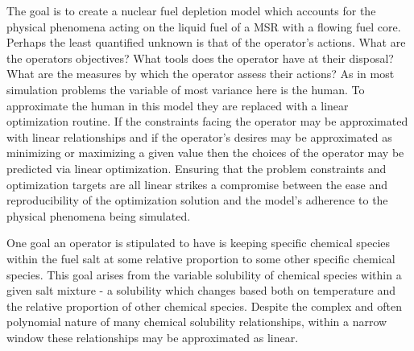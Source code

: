 The goal is to create a nuclear fuel depletion model which accounts for the
physical phenomena acting on the liquid fuel of a MSR with a flowing fuel core.
Perhaps the least quantified unknown is that of the operator's actions. What are
the operators objectives? What tools does the operator have at their disposal?
What are the measures by which the operator assess their actions? As in most
simulation problems the variable of most variance here is the human. To
approximate the human in this model they are replaced with a linear optimization
routine. If the constraints facing the operator may be approximated with linear
 relationships and if the operator's desires may be approximated as minimizing
or maximizing a given value then the choices of the operator may be predicted
via linear optimization. Ensuring that the problem constraints and optimization 
targets are all linear strikes a compromise between the ease and reproducibility
of the optimization solution and the model's adherence to the physical 
phenomena being simulated.

One goal an operator is stipulated to have is keeping specific chemical
species within the fuel salt at some relative proportion to some other
specific chemical species. This goal arises from the variable solubility of
chemical species within a given salt mixture - a solubility which changes
based both on temperature and the relative proportion of other chemical species.
Despite the complex and often polynomial nature of many chemical solubility
relationships, within a narrow window these relationships may be approximated
as linear.

